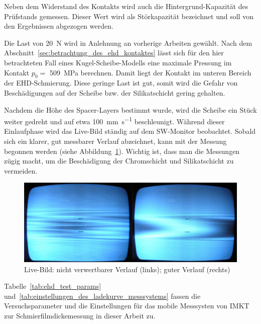 Neben dem Widerstand des Kontakts wird auch die Hintergrund-Kapazität des Prüfstands gemessen.
Dieser Wert wird als Störkapazität bezeichnet und soll von den Ergebnissen abgezogen werden.

Die Last von \SI{20}{\newton} wird in Anlehnung an vorherige Arbeiten gewählt.
Nach dem Abschnitt~\ref{sec:betrachtung_des_ehd_kontaktes} lässt sich für den hier betrachteten Fall eines Kugel-Scheibe-Modells eine maximale Pressung im Kontakt $p_0 =$ \SI{509}{\mega\pascal} berechnen.
Damit liegt der Kontakt im unteren Bereich der EHD-Schmierung.
Diese geringe Last ist gut, somit wird die Gefahr von Beschädigungen auf der Scheibe bzw. der Silikatschicht gering gehalten.

Nachdem die Höhe des Spacer-Layers bestimmt wurde, wird die Scheibe ein Stück weiter gedreht und auf etwa \SI[per-mode=symbol]{100}{\mm\per\second} beschleunigt.
Während dieser Einlaufphase wird das Live-Bild ständig auf dem SW-Monitor beobachtet.
Sobald sich ein klarer, gut messbarer Verlauf abzeichnet, kann mit der Messung begonnen werden (siehe Abbildung~\ref{fig:ehd_live_bild}).
Wichtig ist, dass man die Messungen zügig macht, um die Beschädigung der Chromschicht und Silikatschicht zu vermeiden.

\begin{figure}[htb]
    \centering
    \includegraphics[width=0.8\linewidth]{./images/ehd_live_bild.jpg}
    \caption{Live-Bild: nicht verwertbarer Verlauf (links); guter Verlauf (rechts)~\cite{mach_2008}}
    \label{fig:ehd_live_bild}
\end{figure}

Tabelle~\ref{tab:ehd_test_params} und~\ref{tab:einstellungen_des_ladekurve_messsystems} fassen die Versuchsparameter und die Einstellungen für das mobile Messsysten von IMKT zur Schmierfilmdickemessung in dieser Arbeit zu.





